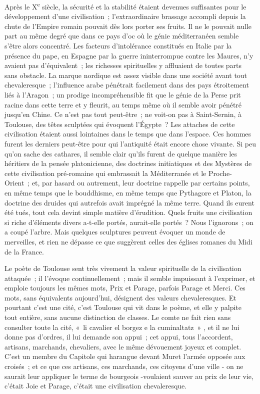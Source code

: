 \documentclass[french,twoside]{book} %
\begin{document}
Après le X\textsuperscript{e} siècle, la sécurité et la stabilité étaient devenues suffisantes pour le développement d'une civilisation ; l'extraordinaire brassage accompli depuis la chute de l'Empire romain pouvait dès lors porter ses fruits. Il ne le pouvait nulle part au même degré que dans ce pays d'oc où le génie méditer­ranéen semble s'être alors concentré. Les facteurs d'intolérance constitués en Italie par la présence du pape, en Espagne par la guerre ininterrompue contre les Maures, n'y avaient pas d'équivalent ; les richesses spirituelles y affluaient de toutes parts sans obstacle. La marque nordique est assez visible dans une société avant tout chevaleresque ; l'influence arabe pénétrait facilement dans des pays étroitement liés à l'Aragon ; un prodige incompréhensible fit que le génie de la Perse prit racine dans cette terre et y fleurit, au temps même où il semble avoir pénétré jusqu'en Chine. Ce n'est pas tout peut-être ; ne voit-on pas à Saint-Sernin, à Toulouse, des têtes sculptées qui évoquent l'Égypte ? Les attaches de cette civilisation étaient aussi lointaines dans le temps que dans l'espace. Ces hommes furent les derniers peut-être pour qui l'antiquité était encore chose vivante. Si peu qu'on sache des cathares, il semble clair qu'ils furent de quelque manière les héritiers de la pensée platonicienne, des doctrines initiatiques et des Mystères de cette civilisation pré-romaine qui embrassait la Méditerranée et le Proche-Orient ; et, par hasard ou autrement, leur doctrine rappelle par certains points, en même temps que le bouddhisme, en même temps que Pythagore et Platon, la doctrine des druides qui autrefois avait imprégné la même terre. Quand ils eurent été tués, tout cela devint simple matière d'érudition. Quels fruits une civilisation si riche d'éléments divers a-t-elle portés, aurait-elle portés ? Nous l'ignorons ; on a coupé l'arbre. Mais quelques sculptures peuvent évoquer un monde de merveilles, et rien ne dépasse ce que suggèrent celles des églises romanes du Midi de la France.\par
\par
Le poète de Toulouse sent très vivement la valeur spirituelle de la civilisa­tion attaquée ; il l'évoque continuellement ; mais il semble impuissant à l'exprimer, et emploie toujours les mêmes mots, Prix et Parage, parfois Parage et Merci. Ces mots, sans équivalents aujourd'hui, désignent des valeurs cheva­leresques. Et pourtant c'est une cité, c'est Toulouse qui vit dans le poème, et elle y palpite tout entière, sans aucune distinction de classes. Le comte ne fait rien sans consulter toute la cité, « li cavalier el borgez e la cuminaltatz » , et il ne lui donne pas d'ordres, il lui demande son appui ; cet appui, tous l'accor­dent, artisans, marchands, chevaliers, avec le même dévouement joyeux et complet. C'est un membre du Capitole qui harangue devant Muret l'armée opposée aux croisés ; et ce que ces artisans, ces marchands, ces citoyens d'une ville - on ne saurait leur appliquer le terme de bourgeois -voulaient sauver au prix de leur vie, c'était Joie et Parage, c'était une civilisation chevaleresque.\par
\end{document}
